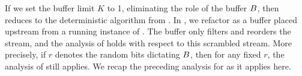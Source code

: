 \documentclass[oneside,letterpaper]{scrartcl} \usepackage{macros}
\begin{document}
If we set the buffer limit $K$ to 1, eliminating the role of the
buffer $B$, then  reduces
to the deterministic  algorithm from
. In
, we refactor
as a buffer placed upstream from a running instance of
. The buffer only filters and reorders the
stream, and the analysis of  holds with
respect to this scrambled stream.  More precisely, if $r$ denotes the
random bits dictating $B$, then for any fixed $r$, the analysis
of  still applies. We recap the preceding
analysis for  as it applies here.
\end{document}
